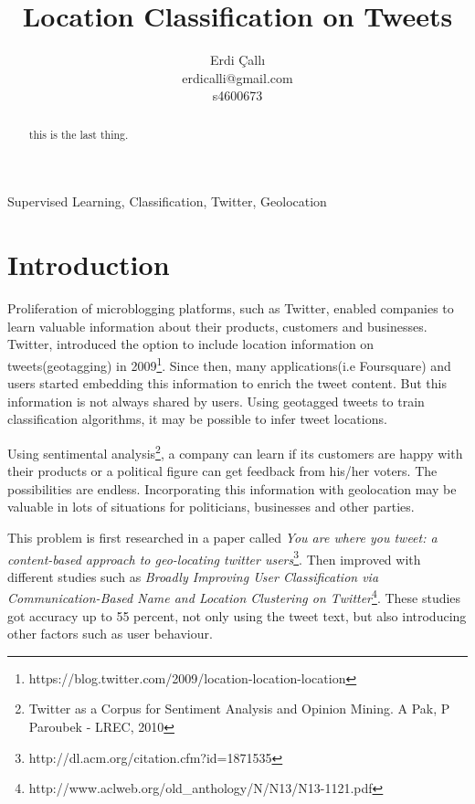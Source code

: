 \documentclass[twoside,11pt]{article}
\begin{document}
\title{Location Classification on Tweets}
\author{\name Erdi \c{C}all{\i} \\ \email erdicalli@gmail.com \\ s4600673}

\maketitle

\begin{abstract}%
this is the last thing.
\end{abstract}

\begin{keywords}
Supervised Learning, Classification, Twitter, Geolocation
\end{keywords}


\section{Introduction}

Proliferation of microblogging platforms, such as Twitter, enabled companies to learn valuable information about their products, customers and businesses. Twitter, introduced the option to include location information on tweets(geotagging) in 2009\footnote{https://blog.twitter.com/2009/location-location-location}. Since then, many applications(i.e Foursquare) and users started embedding this information to enrich the tweet content. But this information is not always shared by users. Using geotagged tweets to train classification algorithms, it may be possible to infer tweet locations. 

Using sentimental analysis\footnote{Twitter as a Corpus for Sentiment Analysis and Opinion Mining. A Pak, P Paroubek - LREC, 2010}, a company can learn if its customers are happy with their products or a political figure can get feedback from his/her voters. The possibilities are endless. Incorporating this information with geolocation may be valuable in lots of situations for politicians, businesses and other parties.

This problem is first researched in a paper called \textit{You are where you tweet: a content-based approach to geo-locating twitter users}\footnote{http://dl.acm.org/citation.cfm?id=1871535}. Then improved with different studies such as \textit{Broadly Improving User Classification via
Communication-Based Name and Location Clustering on Twitter}\footnote{http://www.aclweb.org/old\_anthology/N/N13/N13-1121.pdf}. These studies got accuracy up to 55 percent, not only using the tweet text, but also introducing other factors such as user behaviour.
\end{document}
